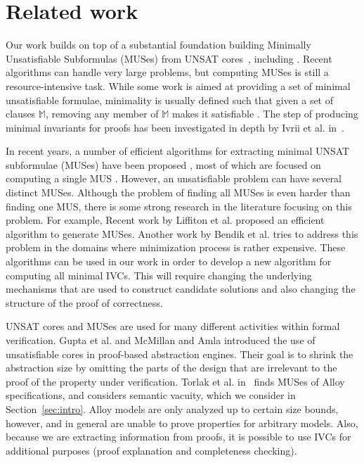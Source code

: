 \section{Related work}
\label{sec:related}

Our work builds on top of a substantial foundation building Minimally Unsatisfiable Subformulas
(MUSes) from UNSAT cores~\cite{Cimatti2007:UNSAT}, including \cite{marques2010minimal, belov2012towards, ryvchin2011faster, belov2012computing, nadel2010boosting}.  Recent algorithms can handle very large problems, but computing MUSes is still a resource-intensive task.  While some work is aimed at providing a set of minimal unsatisfiable formulae, minimality is usually defined such that given a set of clauses $\mathbb{M}$, removing any member of $\mathbb{M}$ makes it satisfiable \cite{belov2012computing}.  The step of producing minimal invariants for proofs has been investigated in depth by Ivrii et al. in~\cite{Ivrii14:invariants}.

In  recent  years,  a  number  of  efficient algorithms  for  extracting minimal UNSAT subformulae (MUSes)  have  been proposed \cite{liffiton2005max},
most of which are focused on computing a single MUS  \cite{bacchus2015using, belov2012muser2, belov2013core, belov2012towards, nadel2014accelerated}.
However, an unsatisfiable problem can have several distinct MUSes. Although the problem of finding all MUSes is even harder than finding one MUS, there is some strong research in the literature focusing on this problem. For example, Recent work by Liffiton et al. \cite{marco2016fast} proposed an efficient algorithm to generate MUSes.
Another work by Bendik et al. \cite{bendk16} tries to address this problem in the domains where minimization process is rather expensive.
These algorithms can be used in our work in order to develop a new algorithm for computing all minimal IVCs. This will require changing the underlying mechanisms that are used to construct candidate solutions and also changing the structure of the proof of correctness.

UNSAT cores and MUSes are used for many different activities within
formal verification. Gupta et al. \cite{gupta2003iterative} and
McMillan and Amla \cite{mcmillan2003automatic} introduced the use of
unsatisfiable cores in proof-based abstraction engines. Their goal is
to shrink the abstraction size by omitting the parts of the design
that are irrelevant to the proof of the property under verification.
Torlak et al. in~\cite{Torlak08:cores} finds MUSes of Alloy
specifications, and considers semantic vacuity, which we consider in
Section~\ref{sec:intro}. Alloy models are only analyzed up to certain
size bounds, however, and in general are unable to prove properties
for arbitrary models. Also, because we are extracting information from
proofs, it is possible to use IVCs for additional purposes (proof
explanation and completeness checking).

